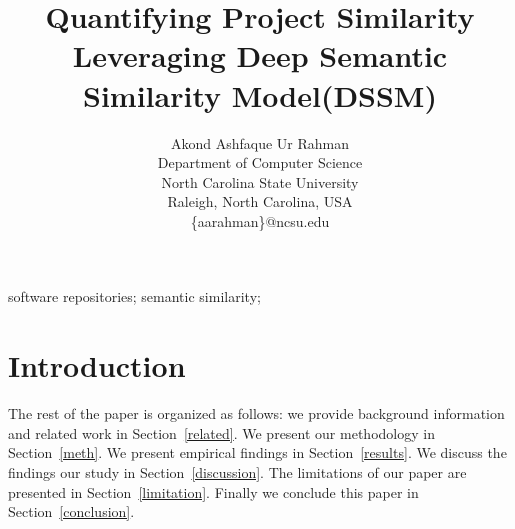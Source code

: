 \documentclass[conference]{IEEEtran}
\begin{document}
\title{Quantifying Project Similarity Leveraging Deep Semantic Similarity Model(DSSM)}




\author{
    Akond Ashfaque Ur Rahman\\
    Department of Computer Science\\
    North Carolina State University\\
    Raleigh, North Carolina, USA\\
    \{aarahman\}@ncsu.edu 

}


\maketitle

\begin{abstract}


\end{abstract}


\IEEEpeerreviewmaketitle

\begin{IEEEkeywords} 
software repositories; semantic similarity;
\end{IEEEkeywords}




\section{Introduction}







The rest of the paper is organized as follows: we provide background information and related work in Section~\ref{related}. We present our methodology in Section~\ref{meth}. We present empirical findings in Section~\ref{results}. We discuss the findings our study in Section~\ref{discussion}. The limitations of our paper are presented in Section~\ref{limitation}. Finally we conclude this paper in Section~\ref{conclusion}. 




\end{document}
